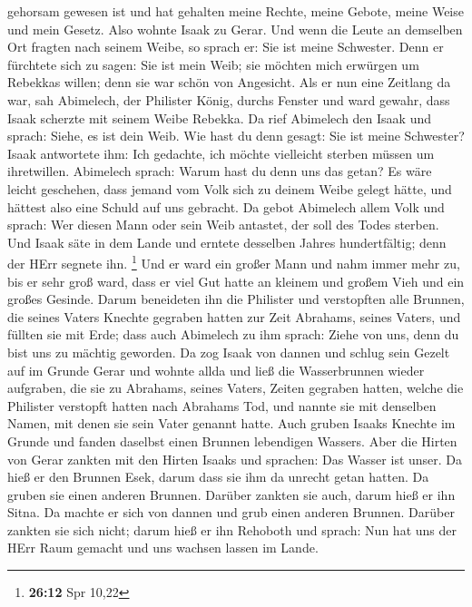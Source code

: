 gehorsam gewesen ist und hat gehalten meine Rechte, meine Gebote, meine
Weise und mein Gesetz.  Also wohnte Isaak zu Gerar.
 Und wenn die Leute an demselben Ort fragten nach seinem
Weibe, so sprach er: Sie ist meine Schwester. Denn er fürchtete sich zu
sagen: Sie ist mein Weib; sie möchten mich erwürgen um Rebekkas willen;
denn sie war schön von Angesicht.  Als er nun eine Zeitlang
da war, sah Abimelech, der Philister König, durchs Fenster und ward
gewahr, dass Isaak scherzte mit seinem Weibe Rebekka.  Da
rief Abimelech den Isaak und sprach: Siehe, es ist dein Weib. Wie hast
du denn gesagt: Sie ist meine Schwester? Isaak antwortete ihm: Ich
gedachte, ich möchte vielleicht sterben müssen um ihretwillen.
 Abimelech sprach: Warum hast du denn uns das getan? Es
wäre leicht geschehen, dass jemand vom Volk sich zu deinem Weibe gelegt
hätte, und hättest also eine Schuld auf uns gebracht.  Da
gebot Abimelech allem Volk und sprach: Wer diesen Mann oder sein Weib
antastet, der soll des Todes sterben.  Und Isaak säte in
dem Lande und erntete desselben Jahres hundertfältig; denn der HErr
segnete ihn. \footnote{\textbf{26:12} Spr 10,22}  Und er
ward ein großer Mann und nahm immer mehr zu, bis er sehr groß ward,
 dass er viel Gut hatte an kleinem und großem Vieh und ein
großes Gesinde. Darum beneideten ihn die Philister  und
verstopften alle Brunnen, die seines Vaters Knechte gegraben hatten zur
Zeit Abrahams, seines Vaters, und füllten sie mit Erde; 
dass auch Abimelech zu ihm sprach: Ziehe von uns, denn du bist uns zu
mächtig geworden.  Da zog Isaak von dannen und schlug sein
Gezelt auf im Grunde Gerar und wohnte allda  und ließ die
Wasserbrunnen wieder aufgraben, die sie zu Abrahams, seines Vaters,
Zeiten gegraben hatten, welche die Philister verstopft hatten nach
Abrahams Tod, und nannte sie mit denselben Namen, mit denen sie sein
Vater genannt hatte.  Auch gruben Isaaks Knechte im Grunde
und fanden daselbst einen Brunnen lebendigen Wassers.  Aber
die Hirten von Gerar zankten mit den Hirten Isaaks und sprachen: Das
Wasser ist unser. Da hieß er den Brunnen Esek, darum dass sie ihm da
unrecht getan hatten.  Da gruben sie einen anderen Brunnen.
Darüber zankten sie auch, darum hieß er ihn Sitna.  Da
machte er sich von dannen und grub einen anderen Brunnen. Darüber
zankten sie sich nicht; darum hieß er ihn Rehoboth und sprach: Nun hat
uns der HErr Raum gemacht und uns wachsen lassen im Lande. 
